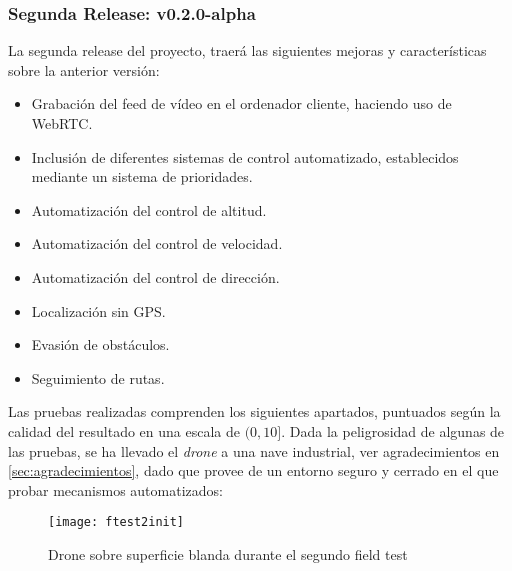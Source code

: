 \subsubsection{Segunda Release: v0.2.0-alpha}
\label{subsec:fieldTestingv2}

La segunda release del proyecto, traerá las siguientes mejoras y características sobre la anterior versión:
\begin{itemize}
\item Grabación del feed de vídeo en el ordenador cliente, haciendo uso de WebRTC.
\item Inclusión de diferentes sistemas de control automatizado, establecidos mediante un sistema de prioridades.
\item Automatización del control de altitud.
\item Automatización del control de velocidad.
\item Automatización del control de dirección.
\item Localización sin GPS.
\item Evasión de obstáculos.
\item Seguimiento de rutas.
\end{itemize}

Las pruebas realizadas comprenden los siguientes apartados, puntuados según la calidad del resultado en una escala de $(0, 10]$. Dada la peligrosidad de algunas de las pruebas, se ha llevado el \emph{drone} a una nave industrial, ver agradecimientos en \ref{sec:agradecimientos}, dado que provee de un entorno seguro y cerrado en el que probar mecanismos automatizados:
\begin{figure}[H]
	\centering
	\texttt{[image: ftest2init]}
	\caption[Field Test 2. Nave industrial]{Drone sobre superficie blanda durante el segundo field test}\label{fig:ftest2init}
\end{figure}

